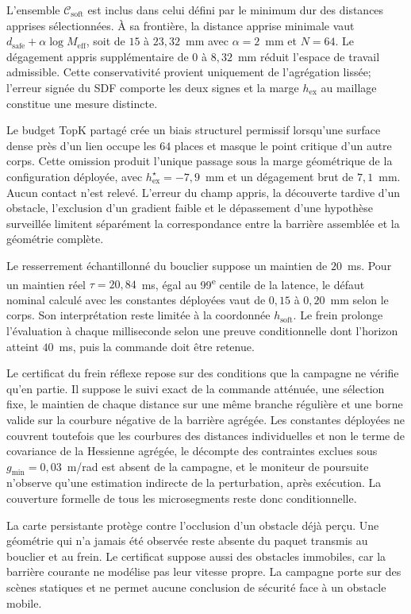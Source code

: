 L'ensemble $\mathcal{C}_{\mathrm{soft}}$ est inclus dans celui défini par le minimum dur des distances apprises sélectionnées. À sa frontière, la distance apprise minimale vaut $d_{\mathrm{safe}}+\alpha\log M_{\mathrm{eff}}$, soit de $15$ à $23{,}32$~mm avec $\alpha=2$~mm et $N=64$. Le dégagement appris supplémentaire de $0$ à $8{,}32$~mm réduit l'espace de travail admissible. Cette conservativité provient uniquement de l'agrégation lissée; l'erreur signée du \ac{SDF} comporte les deux signes et la marge $h_{\mathrm{ex}}$ au maillage constitue une mesure distincte.

Le budget TopK partagé crée un biais structurel permissif lorsqu'une surface dense près d'un lien occupe les $64$ places et masque le point critique d'un autre corps. Cette omission produit l'unique passage sous la marge géométrique de la configuration déployée, avec $h_{\mathrm{ex}}^{\star}=-7{,}9$~mm et un dégagement brut de $7{,}1$~mm. Aucun contact n'est relevé. L'erreur du champ appris, la découverte tardive d'un obstacle, l'exclusion d'un gradient faible et le dépassement d'une hypothèse surveillée limitent séparément la correspondance entre la barrière assemblée et la géométrie complète.

Le resserrement échantillonné du bouclier suppose un maintien de $20$~ms. Pour un maintien réel $\tau=20{,}84$~ms, égal au 99\textsuperscript{e} centile de la latence, le défaut nominal calculé avec les constantes déployées vaut de $0{,}15$ à $0{,}20$~mm selon le corps. Son interprétation reste limitée à la coordonnée $h_{\mathrm{soft}}$. Le frein prolonge l'évaluation à chaque milliseconde selon une preuve conditionnelle dont l'horizon atteint $40$~ms, puis la commande doit être retenue.

Le certificat du frein réflexe repose sur des conditions que la campagne ne vérifie qu'en partie. Il suppose le suivi exact de la commande atténuée, une sélection fixe, le maintien de chaque distance sur une même branche régulière et une borne valide sur la courbure négative de la barrière agrégée. Les constantes déployées ne couvrent toutefois que les courbures des distances individuelles et non le terme de covariance de la Hessienne agrégée, le décompte des contraintes exclues sous $g_{\min}=0{,}03$~m/rad est absent de la campagne, et le moniteur de poursuite n'observe qu'une estimation indirecte de la perturbation, après exécution. La couverture formelle de tous les microsegments reste donc conditionnelle.

La carte persistante protège contre l'occlusion d'un obstacle déjà perçu. Une géométrie qui n'a jamais été observée reste absente du paquet transmis au bouclier et au frein. Le certificat suppose aussi des obstacles immobiles, car la barrière courante ne modélise pas leur vitesse propre. La campagne porte sur des scènes statiques et ne permet aucune conclusion de sécurité face à un obstacle mobile.

